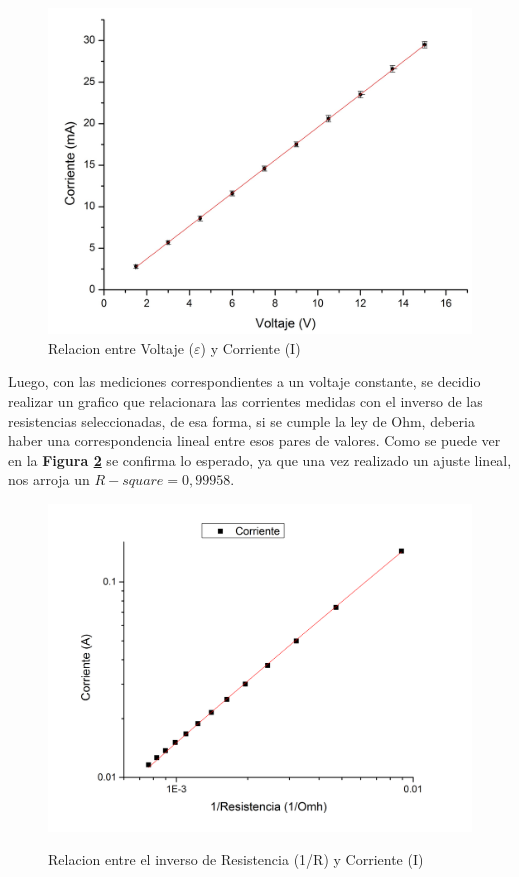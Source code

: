\documentclass[11pt,a4paper]{article}
\begin{document}
\begin{figure}[h]
  \centering
  \includegraphics[scale=0.4]{Corriente_vs_Voltaje}
  \caption{Relacion entre Voltaje ($\varepsilon$) y Corriente (I)}
  \label{fig:Ohm_lin}
\end{figure}

Luego, con las mediciones correspondientes a un voltaje constante, se decidio realizar un grafico que relacionara las corrientes medidas con el inverso de las resistencias seleccionadas, de esa forma, si se cumple la ley de Ohm, deberia haber una correspondencia lineal entre esos pares de valores. Como se puede ver en la \textbf{Figura \ref{fig:Ohm_hip}} se confirma lo esperado, ya que una vez realizado un ajuste lineal, nos arroja un $R-square = 0,99958$.


\begin{figure}[h]
  \centering
  \includegraphics[scale=0.4]{Corriente_vs_InversoResistencia}
  \\[1.0cm]
  \caption{Relacion entre el inverso de Resistencia (1/R) y Corriente (I)}
  \label{fig:Ohm_hip}
\end{figure}
\end{document}
